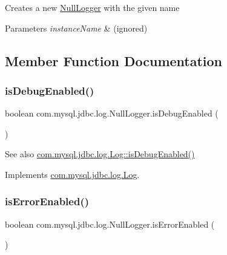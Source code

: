 Creates a new \mbox{\hyperlink{classcom_1_1mysql_1_1jdbc_1_1log_1_1_null_logger}{Null\+Logger}} with the given name


\begin{DoxyParams}{Parameters}
{\em instance\+Name} & (ignored) \\
\hline
\end{DoxyParams}


\subsection{Member Function Documentation}
\mbox{\label{classcom_1_1mysql_1_1jdbc_1_1log_1_1_null_logger_a4d03ecff15bd998bbffd11a684e561b5}} 
\subsubsection{\texorpdfstring{is\+Debug\+Enabled()}{isDebugEnabled()}}
{\footnotesize\ttfamily boolean com.\+mysql.\+jdbc.\+log.\+Null\+Logger.\+is\+Debug\+Enabled (\begin{DoxyParamCaption}{ }\end{DoxyParamCaption})}

\begin{DoxySeeAlso}{See also}
\mbox{\hyperlink{interfacecom_1_1mysql_1_1jdbc_1_1log_1_1_log_a2e59f38e2359e90879c658cfb2f4e518}{com.\+mysql.\+jdbc.\+log.\+Log\+::is\+Debug\+Enabled()}} 
\end{DoxySeeAlso}


Implements \mbox{\hyperlink{interfacecom_1_1mysql_1_1jdbc_1_1log_1_1_log_a2e59f38e2359e90879c658cfb2f4e518}{com.\+mysql.\+jdbc.\+log.\+Log}}.

\mbox{\label{classcom_1_1mysql_1_1jdbc_1_1log_1_1_null_logger_a8d58edceeb939928c01ae93a4c62dfd5}} 
\subsubsection{\texorpdfstring{is\+Error\+Enabled()}{isErrorEnabled()}}
{\footnotesize\ttfamily boolean com.\+mysql.\+jdbc.\+log.\+Null\+Logger.\+is\+Error\+Enabled (\begin{DoxyParamCaption}{ }\end{DoxyParamCaption})}

